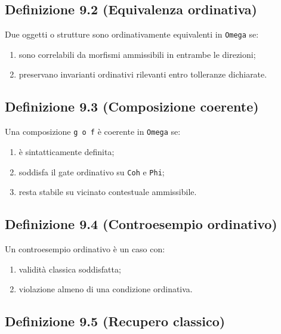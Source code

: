 \subsection{Definizione 9.2 (Equivalenza ordinativa)}

Due oggetti o strutture sono ordinativamente equivalenti in \texttt{Omega} se:

\begin{enumerate}
\def\labelenumi{\arabic{enumi}.}
\tightlist
\item
  sono correlabili da morfismi ammissibili in entrambe le direzioni;
\item
  preservano invarianti ordinativi rilevanti entro tolleranze dichiarate.
\end{enumerate}

\subsection{Definizione 9.3 (Composizione coerente)}

Una composizione \texttt{g\ o\ f} è coerente in \texttt{Omega} se:

\begin{enumerate}
\def\labelenumi{\arabic{enumi}.}
\tightlist
\item
  è sintatticamente definita;
\item
  soddisfa il gate ordinativo su \texttt{Coh} e \texttt{Phi};
\item
  resta stabile su vicinato contestuale ammissibile.
\end{enumerate}

\subsection{Definizione 9.4 (Controesempio ordinativo)}

Un controesempio ordinativo è un caso con:

\begin{enumerate}
\def\labelenumi{\arabic{enumi}.}
\tightlist
\item
  validità classica soddisfatta;
\item
  violazione almeno di una condizione ordinativa.
\end{enumerate}

\subsection{Definizione 9.5 (Recupero classico)}

